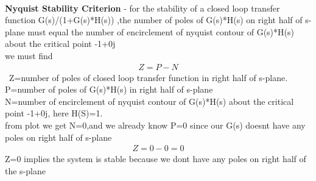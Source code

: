 \begin{enumerate}[label=\thesection.\arabic*.,ref=\thesection.\theenumi]
\\
\solution 
 \textbf{Nyquist Stability Criterion} - for  the stability of a closed loop transfer function G(s)/(1+G(s)*H(s)) ,the number of poles of G(s)*H(s) on right half of s-plane must equal the number of encirclement of nyquist contour of  G(s)*H(s) about the critical point -1+0j
\\
 we must find
\begin{align}
Z=P-N    
\end{align}
\
Z=number of poles of closed loop transfer function in right half of s-plane.
\\ 
 P=number of poles of G(s)*H(s) in right half of s-plane
\\ 
 N=number of encirclement of nyquist contour of G(s)*H(s) about the critical point -1+0j,
here H(S)=1.
\\ 
 from plot we get N=0,and we already know P=0 since our G(s) doesnt have any poles on right half of s-plane
\begin{align}
Z=0-0=0
\end{align}
Z=0 implies the system is stable because we dont have any poles on right half of the s-plane



\end{enumerate}
